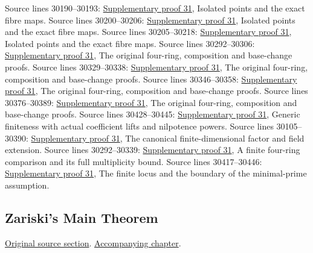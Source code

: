 \begin{AlgebraSourceRoutes}
 Source lines 30190--30193: \hyperlink{algebra_quasifinite_notes_20260928}{Supplementary proof 31}, Isolated points and the exact fibre maps.
 Source lines 30200--30206: \hyperlink{algebra_quasifinite_notes_20260928}{Supplementary proof 31}, Isolated points and the exact fibre maps.
 Source lines 30205--30218: \hyperlink{algebra_quasifinite_notes_20260928}{Supplementary proof 31}, Isolated points and the exact fibre maps.
 Source lines 30292--30306: \hyperlink{algebra_quasifinite_notes_20260928}{Supplementary proof 31}, The original four-ring, composition and base-change proofs.
 Source lines 30329--30338: \hyperlink{algebra_quasifinite_notes_20260928}{Supplementary proof 31}, The original four-ring, composition and base-change proofs.
 Source lines 30346--30358: \hyperlink{algebra_quasifinite_notes_20260928}{Supplementary proof 31}, The original four-ring, composition and base-change proofs.
 Source lines 30376--30389: \hyperlink{algebra_quasifinite_notes_20260928}{Supplementary proof 31}, The original four-ring, composition and base-change proofs.
 Source lines 30428--30445: \hyperlink{algebra_quasifinite_notes_20260928}{Supplementary proof 31}, Generic finiteness with actual coefficient lifts and nilpotence powers.
 Source lines 30105--30390: \hyperlink{algebra_quasifinite_notes_20260928}{Supplementary proof 31}, The canonical finite-dimensional factor and field extension.
 Source lines 30292--30339: \hyperlink{algebra_quasifinite_notes_20260928}{Supplementary proof 31}, A finite four-ring comparison and its full multiplicity bound.
 Source lines 30417--30446: \hyperlink{algebra_quasifinite_notes_20260928}{Supplementary proof 31}, The finite locus and the boundary of the minimal-prime assumption.
\end{AlgebraSourceRoutes}

\subsection{Zariski's Main Theorem}
\hypertarget{algebra-source-section-Zariski}{}
\noindent\href{https://github.com/stacks/stacks-project/blob/a04446e57ec1fbc252a871afcec7752fb2807b14/algebra.tex\#L30454}{Original source section}. \href{algebra.pdf\#nameddest=section-Zariski}{Accompanying chapter}.

